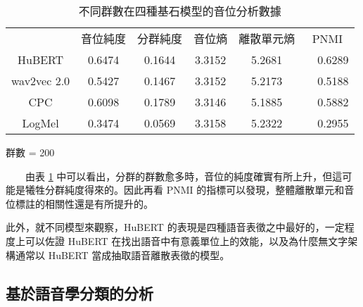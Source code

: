 \begin{table}[!htbp]
            \begin{subtable}[t]{\textwidth}
                \centering
                \begin{tabular}{cccccc}
                                & 音位純度 & 分群純度 & 音位熵 & 離散單元熵 &    PNMI \\
                    HuBERT      &   0.6474 &   0.1644 & 3.3152 &     5.2681 &　0.6289 \\   %
                    wav2vec 2.0 &   0.5427 &   0.1467 & 3.3152 &     5.2173 &　0.5188 \\   %
                    CPC         &   0.6098 &   0.1789 & 3.3146 &     5.1885 &　0.5882 \\   %
                    LogMel      &   0.3474 &   0.0569 & 3.3158 &     5.2322 &　0.2955 \\   %
                \end{tabular}
                \caption{群數 = 200}
                \label{tab:ch3-clu200}
            \end{subtable}        

            \caption{不同群數在四種基石模型的音位分析數據}
            \label{tab:single-cluster-results}
        \end{table}

　　由表 \ref{tab:single-cluster-results} 中可以看出，分群的群數愈多時，音位的純度確實有所上升，但這可能是犧牲分群純度得來的。因此再看 PNMI 的指標可以發現，整體離散單元和音位標註的相關性還是有所提升的。

        此外，就不同模型來觀察，HuBERT 的表現是四種語音表徵之中最好的，一定程度上可以佐證 HuBERT 在找出語音中有意義單位上的效能，以及為什麼無文字架構通常以 HuBERT 當成抽取語音離散表徵的模型。

\subsection{基於語音學分類的分析}

